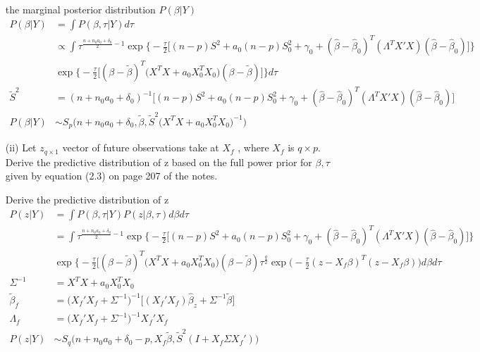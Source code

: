 \begin{itemize}
 the marginal posterior distribution $P(\beta | Y) $
  \begin{align*}
	P(\beta | Y) & = \int P( \beta, \tau | Y) d\tau \\
	& \propto \int \tau^{\frac{n + n_0 a_0 + \delta_0}{2} -1} \exp \Big \{ -\frac{\tau}{2} \Big[ (n-p) S^2  + a_0  (n-p) S_0^2 + \gamma_0 + (\hat{\beta} - \hat{\beta}_0)^T(\Lambda^T X'X) (\hat{\beta} - \hat{\beta}_0) \Big ] \Big \} \\
	& \exp \Big \{  -\frac{\tau}{2} \Big[ (\beta - \tilde{\beta})^T \Big (X^T X +  a_0 X_0^T X_0 \Big ) (\beta - \tilde{\beta})  \Big ] \Big \} d\tau \\
	\tilde{S}^2 & =  (n + n_0 a_0 + \delta_0)^{-1} \Big[ (n-p) S^2  + a_0  (n-p) S_0^2 + \gamma_0 + (\hat{\beta} - \hat{\beta}_0)^T(\Lambda^T X'X) (\hat{\beta} - \hat{\beta}_0) \Big ]\\
	P(\beta | Y) & \sim S_p \Big( n + n_0 a_0 + \delta_0, \tilde{\beta}, \tilde{S}^2 (X^T X +  a_0 X_0^T X_0 \Big )^{-1}	\Big)
 \end{align*}
 
 
 \item[(ii)] Let $z_{q \times 1}$ vector of future observations take at $X_f$ , where $X_f$ is $q \times p$. Derive the predictive distribution of z based on the full power prior for $\beta, \tau$ given by equation (2.3) on page 207 of the notes.
 
Derive the predictive distribution of z
  \begin{align*}
	P(z | Y) & = \int P( \beta, \tau | Y) P(z | \beta, \tau) d\beta d\tau \\
	&= \int \tau^{\frac{n + n_0 a_0 + \delta_0}{2} -1} \exp \Big \{ -\frac{\tau}{2} \Big[ (n-p) S^2  + a_0  (n-p) S_0^2 + \gamma_0 + (\hat{\beta} - \hat{\beta}_0)^T(\Lambda^T X'X) (\hat{\beta} - \hat{\beta}_0) \Big ]  \Big \}  \\
	& \exp \Big \{  -\frac{\tau}{2} \Big[ (\beta - \tilde{\beta})^T \Big (X^T X +  a_0 X_0^T X_0 \Big ) (\beta - \tilde{\beta}) \tau^{\frac{q}{2}} \exp \Big( -\frac{\tau}{2} (z - X_f \beta)^T (z - X_f \beta) \Big) d\beta d\tau\\
	\Sigma^{-1} &= X^T X +  a_0 X_0^T X_0 \\
	\tilde{\beta}_f & = \Big (X_f'X_f + \Sigma^{-1} \Big )^{-1} \Big[ (X_f' X_f) \hat{\beta}_z + \Sigma^{-1} \tilde{\beta} \Big] \\
	\Lambda_f &= \Big (X_f'X_f + \Sigma^{-1} \Big )^{-1} X_f' X_f \\
	P(z | Y) & \sim S_q \Big( n + n_0 a_0 + \delta_0- p, X_f \tilde{\beta} , \tilde{S}^2 (I + X_f \Sigma X_f')	\Big)
 \end{align*}

 \end{itemize}

